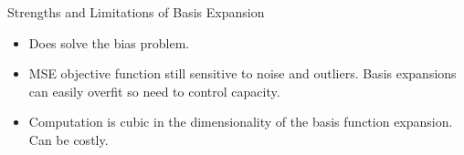 \documentclass[serif,xcolor=pdftex,dvipsnames,table,hyperref={bookmarks=false,breaklinks}]{beamer}
\begin{document}
\begin{frame}[t]{Strengths and Limitations of Basis Expansion} 

\begin{itemize}
\item Does solve the bias problem.

\pause\item MSE objective function still sensitive to noise and outliers. Basis expansions
can easily overfit so need to control capacity.

\pause\item Computation is cubic in the dimensionality of the basis function
expansion. Can be costly.

\end{itemize}

\end{frame}
\end{document}
